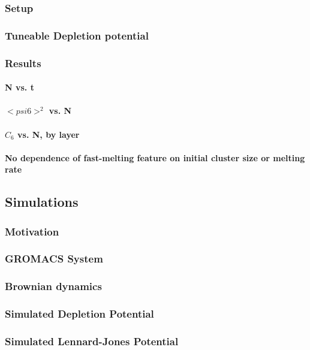 \documentclass{article}
\begin{document}
\subsubsection{Setup}
\label{sec-1.2.1}
\subsubsection{Tuneable Depletion potential}
\label{sec-1.2.2}
\subsubsection{Results}
\label{sec-1.2.3}
\paragraph{N vs. t}
\label{sec-1.2.3.1}
\paragraph{$< psi6 >^2$ vs. N}
\label{sec-1.2.3.2}
\paragraph{$C_6$ vs. N, by layer}
\label{sec-1.2.3.3}
\paragraph{No dependence of fast-melting feature on initial cluster size or melting rate}
\label{sec-1.2.3.4}
\subsection{Simulations}
\label{sec-1.3}
\subsubsection{Motivation}
\label{sec-1.3.1}
\subsubsection{GROMACS System}
\label{sec-1.3.2}
\subsubsection{Brownian dynamics}
\label{sec-1.3.3}
\subsubsection{Simulated Depletion Potential}
\label{sec-1.3.4}
\subsubsection{Simulated Lennard-Jones Potential}
\label{sec-1.3.5}
\end{document}
